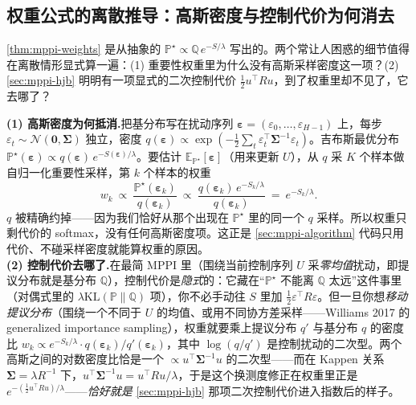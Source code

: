 \subsection{权重公式的离散推导：高斯密度与控制代价为何消去}
\label{sec:mppi-weights-derivation}

\cref{thm:mppi-weights} 是从抽象的 $\mathbb{P}^\star\propto\mathbb{Q}\,e^{-S/\lambda}$ 写出的。两个常让人困惑的细节值得在离散情形显式算一遍：(1) 重要性权重里为什么没有高斯采样密度这一项？(2) \cref{sec:mppi-hjb} 明明有一项显式的二次控制代价 $\tfrac12 u^\top Ru$，到了权重里却不见了，它去哪了？

\begin{derivation}[高斯密度抵消与控制代价的再现]
\label{der:mppi-weights}
\textbf{(1) 高斯密度为何抵消.}\;把基分布写在扰动序列 $\boldsymbol{\varepsilon}=(\varepsilon_0,\dots,\varepsilon_{H-1})$ 上，每步 $\varepsilon_t\sim\mathcal{N}(\mathbf{0},\boldsymbol{\Sigma})$ 独立，密度 $q(\boldsymbol{\varepsilon})\propto\exp(-\tfrac12\sum_t\varepsilon_t^\top\boldsymbol{\Sigma}^{-1}\varepsilon_t)$。吉布斯最优分布 $\mathbb{P}^\star(\boldsymbol{\varepsilon})\propto q(\boldsymbol{\varepsilon})\,e^{-S(\boldsymbol{\varepsilon})/\lambda}$。要估计 $\mathbb{E}_{\mathbb{P}^\star}[\boldsymbol{\varepsilon}]$（用来更新 $U$），从 $q$ 采 $K$ 个样本做自归一化重要性采样，第 $k$ 个样本的权重
\[
  w_k\ \propto\ \frac{\mathbb{P}^\star(\boldsymbol{\varepsilon}_k)}{q(\boldsymbol{\varepsilon}_k)}\ \propto\ \frac{q(\boldsymbol{\varepsilon}_k)\,e^{-S_k/\lambda}}{q(\boldsymbol{\varepsilon}_k)}\ =\ e^{-S_k/\lambda}.
\]
$q$ 被精确约掉——因为我们恰好从那个出现在 $\mathbb{P}^\star$ 里的同一个 $q$ 采样。所以权重只剩代价的 softmax，没有任何高斯密度项。这正是 \cref{sec:mppi-algorithm} 代码只用代价、不碰采样密度就能算权重的原因。\\
\textbf{(2) 控制代价去哪了.}\;在最简 MPPI 里（围绕当前控制序列 $U$ 采\emph{零均值}扰动，即提议分布就是基分布 $\mathbb{Q}$），控制代价是\emph{隐式}的：它藏在“$\mathbb{P}^\star$ 不能离 $\mathbb{Q}$ 太远”这件事里（对偶式里的 $\lambda\mathrm{KL}(\mathbb{P}\|\mathbb{Q})$ 项），你不必手动往 $S$ 里加 $\tfrac12\varepsilon^\top R\varepsilon$。但一旦你想\emph{移动提议分布}（围绕一个不同于 $U$ 的均值、或用不同协方差采样——Williams 2017 的 generalized importance sampling\cite{williams2017model}），权重就要乘上提议分布 $q'$ 与基分布 $q$ 的密度比 $w_k\propto e^{-S_k/\lambda}\cdot q(\boldsymbol{\varepsilon}_k)/q'(\boldsymbol{\varepsilon}_k)$，其中 $\log(q/q')$ 是控制扰动的二次型。两个高斯之间的对数密度比恰是一个 $\propto u^\top\boldsymbol{\Sigma}^{-1}u$ 的二次型——而在 Kappen 关系 $\boldsymbol{\Sigma}=\lambda R^{-1}$ 下，$u^\top\boldsymbol{\Sigma}^{-1}u=u^\top Ru/\lambda$，于是这个换测度修正在权重里正是 $e^{-(\frac12 u^\top Ru)/\lambda}$——\emph{恰好就是} \cref{sec:mppi-hjb} 那项二次控制代价进入指数后的样子。
\end{derivation}

